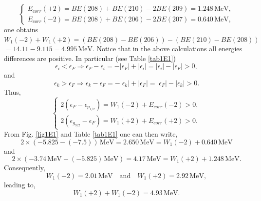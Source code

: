  \begin{equation*}
 \left\{
 \begin{array}{c}
  E_{corr}(+2)=BE(208)+BE(210)-2BE(209)=1.248\,\text{MeV},\\ 
  E_{corr}(-2)=BE(208)+BE(206)-2BE(207)=0.640\,\text{MeV},
 \end{array}
 \right.
 \end{equation*}
 one obtains
 $W_1(-2)+W_1(+2)=(BE(208)-BE(206))-(BE(210)-BE(208))$
 $=14.11-9.115=4.995 \,\text{MeV}$. Notice that in the above calculations all energies differences are positive. In particular (see Table \ref{tab1E1})  
\begin{equation*}
\epsilon_i<\epsilon_F\Rightarrow \epsilon_F-\epsilon_i=-|\epsilon_F|+|\epsilon_i|=|\epsilon_i|-|\epsilon_F|>0,
\end{equation*}
and
\begin{equation*}
\epsilon_k>\epsilon_F\Rightarrow \epsilon_k-\epsilon_F=-|\epsilon_k|+|\epsilon_F|=|\epsilon_F|-|\epsilon_k|>0.
\end{equation*}
Thus,
\begin{equation*}
\left\{
\begin{array}{c}
 2(\epsilon_F-\epsilon_{p_{1/2}})=W_1(-2)+E_{corr}(-2)>0,\\ 
 2(\epsilon_{g_{9/2}}-\epsilon_F)=W_1(+2)+E_{corr}(+2)>0.
\end{array}
\right.
\end{equation*}
From Fig. \ref{fig1E1} and Table \ref{tab1E1} one can then write,
\begin{equation*} 
2\times(-5.825-(-7.5))\,\text{MeV}=2.650\,\text{MeV}=W_1(-2)+0.640\,\text{MeV}
\end{equation*}
and 
\begin{equation*} 
2\times(-3.74\, \text{MeV}-(-5.825)\,\text{MeV})=4.17\, \text{MeV}=W_1(+2)+1.248\, \text{MeV}.
\end{equation*}
Consequently,
\begin{equation*} 
W_1(-2)=2.01\,\text{MeV}\quad \text{and} \quad W_1(+2)=2.92\,\text{MeV},
\end{equation*}
leading to,
\begin{equation*} 
W_1(+2)+W_1(-2)=4.93\,\text{MeV}.
\end{equation*}

